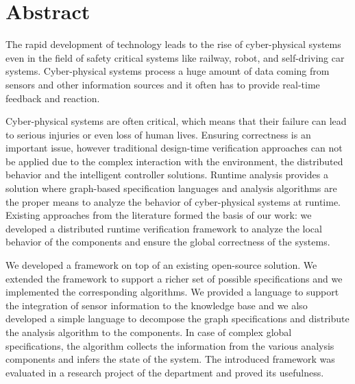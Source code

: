 \vfill
\selectenglish


\chapter*{Abstract}

The rapid development of technology leads to the rise of cyber-physical systems even in the field of safety critical systems like railway, robot, and self-driving car systems. Cyber-physical systems process a huge amount of data coming from sensors and other information sources and it often has to provide real-time feedback and reaction.

Cyber-physical systems are often critical, which means that their failure can lead to serious injuries or even loss of human lives. Ensuring correctness is an important issue, however traditional design-time verification approaches can not be applied due to the complex interaction with the environment, the distributed behavior and the intelligent controller solutions. Runtime analysis provides a solution where graph-based specification languages and analysis algorithms are the proper means to analyze the behavior of cyber-physical systems at runtime. Existing approaches from the literature formed the basis of our work: we developed a distributed runtime verification framework to analyze the local behavior of the components and ensure the global correctness of the systems.

We developed a framework on top of an existing open-source solution. We extended the framework to support a richer set of possible specifications and we implemented the corresponding algorithms. We provided a language to support the integration of sensor information to the knowledge base and we also developed a simple language to decompose the graph specifications and distribute the analysis algorithm to the components. In case of complex global specifications, the algorithm collects the information from the various analysis components and infers the state of the system. The introduced framework was evaluated in a research project of the department and proved its usefulness.



\vfill
\selectthesislanguage

\setcounter{romanPage}{\value{page}}
